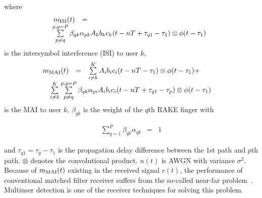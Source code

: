 \documentclass[conference]{IEEEtran}
\begin{document}
\noindent where
\begin{equation} \hspace{-0.05in}
\begin{array}{rcl}
 m_{\rm ISI}(t)&=&\\
 &&\hspace{-0.83in}\sum\limits^{p,q=P}_{p\neq
q}\beta_{qk} \alpha_{pk}A_kb_kc_k(t-nT+\tau_{q1}-\tau_1)\otimes
\phi(t-\tau_1)
\end{array}
\end{equation}
\noindent is the intersymbol interference (ISI) to user $k$,
\begin{equation} \hspace{-0.17in}
\begin{array}{rcl}
m_{\rm MAI}(t)&=&\sum\limits_{i\neq
 k}^{K}A_ib_ic_i(t-nT-\tau_1)\otimes\phi(t-\tau_1)+\\
 &&\hspace{-0.75in}\sum\limits_{i\neq
 k}^{K}\sum\limits^{p,q=P}_{p\neq
q}\beta_{qk}
\alpha_{pi}A_ib_ic_i(t-nT+\tau_{q1}-\tau_p)\otimes\phi(t-\tau_1)
\end{array}
\end{equation}
\noindent is the MAI to user $k$, $\beta_{qk}$ is the weight of
the $q$th RAKE finger with

\begin{equation}
\begin{array}{rcl}
\sum\limits_{q=1}^{P}\beta_{qk}\alpha_{qk}&=&1
\end{array}
\end{equation}

\noindent and $\tau_{q1} = \tau_{q}-\tau_1$ is the propagation
delay difference between the $1$st path and $p$th path. $\otimes$
denotes the convolutional product. $n(t)$ is AWGN with variance
$\sigma^2$. Because of $m_{\rm MAI}(t)$ existing in the received
signal $r(t)$, the performance of conventional matched filter
receiver suffers from the so-called near-far
problem~\cite{Verd98}. Multiuser detection is one of the receiver
techniques for solving this problem.
\end{document}
